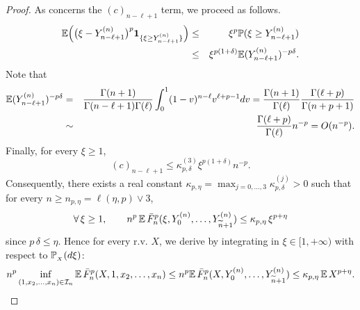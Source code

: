 \begin{proof}
As concerns the $(c)_{n-\ell+1}$ term, we proceed as follows. 
\begin{eqnarray*}
\mathbb{E}\Big(\big ( \xi-Y^{(n)}_{n-\ell+1}\big)^p\mbox{\bf 1}_{\{\xi \ge Y^{(n)}_{n-\ell+1}\}} \Big)&\le&  \xi ^p \mathbb{P}(\xi \ge Y^{(n)}_{n-\ell+1})\\
&\le& \xi^{p(1+\delta)}  \mathbb{E} (Y^{(n)}_{n-\ell+1})^{-p\delta}.
\end{eqnarray*}
Note that 
\begin{eqnarray*}
\mathbb{E} (Y^{(n)}_{n-\ell+1})^{-p\delta} &=&\frac{\Gamma(n+1)}{\Gamma(n-\ell+1)\Gamma(\ell)}\int_0^1 (1-v)^{n-\ell}v^{\ell+p-1}dv =\frac{\Gamma(n+1)}{\Gamma(\ell)} \frac{\Gamma(\ell+p)  }{\Gamma(n+p+1)}\\
&\sim& \frac{\Gamma(\ell+p)}{\Gamma(\ell)}n^{-p} = O(n^{-p}).
\end{eqnarray*}
Finally, for every $ \xi \ge 1$, 
\[
(c)_{n-\ell+1}\le \kappa_{p,\delta}^{(3)}\xi^{p(1+\delta)}n^{-p}.
\]
Consequently, there exists a real constant  $\kappa_{p,\eta} =
\max_{j=0,\ldots,3} \kappa^{(j)}_{p, \delta}>0$ such that for
every $n\ge n_{p,\eta}= \ell(\eta,p)\vee 3$,
\[
 \forall\, \xi \ge 1,\qquad n^p \,\mathbb{E}\,
 \bar F^p_{n}(\xi, Y^{(n)}_0,\ldots,Y^{(n)}_{\widetilde n+1})\le
 \kappa_{p,\eta} \,\xi^{p+\eta}
\]
since $p\,\delta \le \eta$. Hence for every r.v.  $X$, we derive by integrating in $\xi\!\in [1,+\infty)$ with respect to $\mathbb{P}_{_X}(d\xi)$:
\[
n^p \inf_{(1,x_2,\ldots,x_n)\in {\cal I}_n}\mathbb{E}\, \bar F^p_{n}(X,1,x_2,\ldots,x_n)\le  n^p \mathbb{E}\, \bar F^p_{n}(X,Y^{(n)}_0,\ldots,Y^{(n)}_{\widetilde n+1})\le \kappa_{p,\eta}\,\mathbb{E} \,X^{p+\eta}.
\]




\end{proof}

